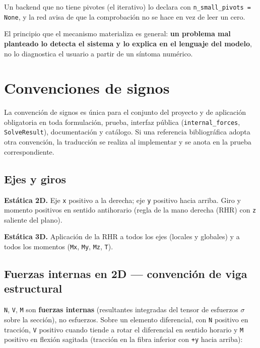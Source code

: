 \documentclass[11pt,oneside]{report}
\begin{document}
Un backend que no tiene pivotes (el iterativo) lo declara con \texttt{n\_\allowbreak{}small\_\allowbreak{}pivots = None}, y la red avisa de que la comprobación no se hace en vez de leer un cero.

El principio que el mecanismo materializa es general: \textbf{un problema mal planteado lo detecta el sistema y lo explica en el lenguaje del modelo}, no lo diagnostica el usuario a partir de un síntoma numérico.



\newpage

\chapter{Convenciones de signos}
\label{cap:6}



La convención de signos es única para el conjunto del proyecto y de aplicación obligatoria en toda formulación, prueba, interfaz pública (\texttt{internal\_forces}, \texttt{SolveResult}), documentación y catálogo. Si una referencia bibliográfica adopta otra convención, la traducción se realiza al implementar y se anota en la prueba correspondiente.

\section{Ejes y giros}

\textbf{Estática 2D.} Eje \texttt{x} positivo a la derecha; eje \texttt{y} positivo hacia arriba. Giro y momento positivos en sentido antihorario (regla de la mano derecha (RHR) con \texttt{z} saliente del plano).

\textbf{Estática 3D.} Aplicación de la RHR a todos los ejes (locales y globales) y a todos los momentos (\texttt{Mx}, \texttt{My}, \texttt{Mz}, \texttt{T}).

\section{Fuerzas internas en 2D --- convención de viga estructural}

\texttt{N}, \texttt{V}, \texttt{M} son \textbf{fuerzas internas} (resultantes integradas del tensor de esfuerzos $\sigma$ sobre la sección), no esfuerzos. Sobre un elemento diferencial, con \texttt{N} positivo en tracción, \texttt{V} positivo cuando tiende a rotar el diferencial en sentido horario y \texttt{M} positivo en flexión sagitada (tracción en la fibra inferior con \texttt{+y} hacia arriba):
\end{document}
